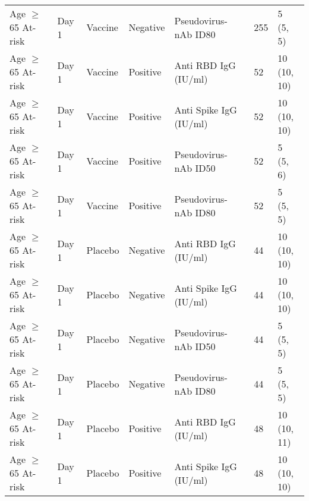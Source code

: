 \documentclass[]{book}
\theoremstyle{definition}
\theoremstyle{definition}
\theoremstyle{definition}
\newcommand{\1}{\mathbbm{1}}
\begin{document}
\begin{landscape}
\begin{ThreePartTable}
\begin{longtable}[t]{>{\raggedright\arraybackslash}p{7cm}llllll}
\hspace{1em}Age $\geq$ 65 At-risk & Day 1 & Vaccine & Negative & Pseudovirus-nAb ID80 & 255 & \makecell[l]{5\\(5, 5)}\\
\hspace{1em}Age $\geq$ 65 At-risk & Day 1 & Vaccine & Positive & Anti RBD IgG (IU/ml) & 52 & \makecell[l]{10\\(10, 10)}\\
\hspace{1em}Age $\geq$ 65 At-risk & Day 1 & Vaccine & Positive & Anti Spike IgG (IU/ml) & 52 & \makecell[l]{10\\(10, 10)}\\
\hspace{1em}Age $\geq$ 65 At-risk & Day 1 & Vaccine & Positive & Pseudovirus-nAb ID50 & 52 & \makecell[l]{5\\(5, 6)}\\
\hspace{1em}Age $\geq$ 65 At-risk & Day 1 & Vaccine & Positive & Pseudovirus-nAb ID80 & 52 & \makecell[l]{5\\(5, 5)}\\
\hspace{1em}Age $\geq$ 65 At-risk & Day 1 & Placebo & Negative & Anti RBD IgG (IU/ml) & 44 & \makecell[l]{10\\(10, 10)}\\
\hspace{1em}Age $\geq$ 65 At-risk & Day 1 & Placebo & Negative & Anti Spike IgG (IU/ml) & 44 & \makecell[l]{10\\(10, 10)}\\
\hspace{1em}Age $\geq$ 65 At-risk & Day 1 & Placebo & Negative & Pseudovirus-nAb ID50 & 44 & \makecell[l]{5\\(5, 5)}\\
\hspace{1em}Age $\geq$ 65 At-risk & Day 1 & Placebo & Negative & Pseudovirus-nAb ID80 & 44 & \makecell[l]{5\\(5, 5)}\\
\hspace{1em}Age $\geq$ 65 At-risk & Day 1 & Placebo & Positive & Anti RBD IgG (IU/ml) & 48 & \makecell[l]{10\\(10, 11)}\\
\hspace{1em}Age $\geq$ 65 At-risk & Day 1 & Placebo & Positive & Anti Spike IgG (IU/ml) & 48 & \makecell[l]{10\\(10, 10)}\\

\end{longtable}
\end{ThreePartTable}
\end{landscape}
\end{document}
